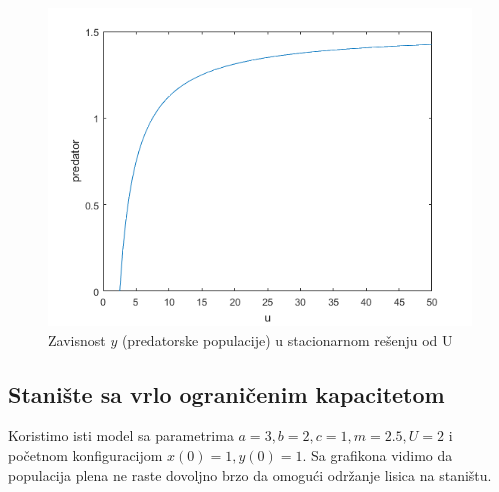 \documentclass[a4paper]{article}
\begin{document}
\begin{figure}[H]
    \centering
    \begin{minipage}{0.75\textwidth}
        \centering
        \includegraphics[width=1\textwidth]{images/predator_vs_u} %
        \caption{Zavisnost $y$ (predatorske populacije) u stacionarnom rešenju od U}
    \end{minipage}
\end{figure}

\subsection{Stanište sa vrlo ograničenim kapacitetom}
\label{sub:log_mod_ogr}

Koristimo isti model sa parametrima $a=3, b=2, c=1, m=2.5, U=2$
i početnom konfiguracijom $x(0)=1, y(0)=1$.
Sa grafikona vidimo da populacija plena ne raste dovoljno brzo da omogući
održanje lisica na staništu.
\end{document}
